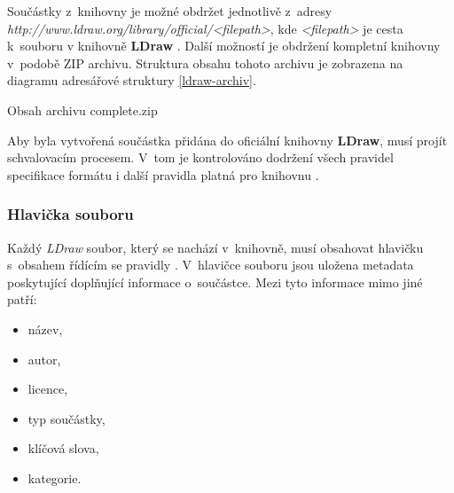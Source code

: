     Součástky z~knihovny je možné obdržet jednotlivě z~adresy \\ \textit{http://www.ldraw.org/library/official/<filepath>}, kde \textit{<filepath>} je cesta k~souboru v knihovně \textbf{LDraw} \autocite{ldraw:download}. Další možností je obdržení kompletní knihovny v~podobě ZIP archivu. Struktura obsahu tohoto archivu je zobrazena na diagramu adresářové struktury \ref{ldraw-archiv}.

    \begin{dirfigure}%
        \caption{Obsah archivu complete.zip}\label{ldraw-archiv}
    \end{dirfigure}

    Aby byla vytvořená součástka přidána do oficiální knihovny \textbf{LDraw}, musí projít schvalovacím procesem. V~tom je kontrolováno dodržení všech pravidel specifikace formátu \autocite{ldraw:file:specification} i další pravidla platná pro knihovnu \cite{ldraw:library:restrictions}.

    \subsubsection{Hlavička souboru}\label{ldraw-hlavicka}
        Každý \textit{LDraw} soubor, který se nachází v~knihovně, musí obsahovat hlavičku s~obsahem řídícím se pravidly \autocite{ldraw:header:specification}. V~hlavičce souboru jsou uložena metadata poskytující doplňující informace o~součástce. Mezi tyto informace mimo jiné patří:
        \begin{itemize}
            \item název,
            \item autor,
            \item licence,
            \item typ součástky,
            \item klíčová slova,
            \item kategorie.
        \end{itemize}
 
